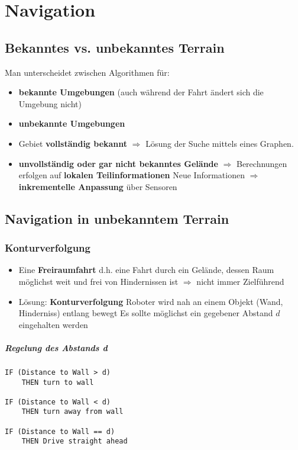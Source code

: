 \chapter{Navigation}
\section{Bekanntes vs. unbekanntes Terrain}
Man unterscheidet zwischen Algorithmen für:
\begin{itemize}
	\item \textbf{bekannte Umgebungen} (auch während der Fahrt ändert sich die Umgebung nicht)
	\item \textbf{unbekannte Umgebungen}
\end{itemize}
\begin{itemize}
	\item Gebiet \textbf{vollständig bekannt} $\Rightarrow$ Lösung der Suche mittels eines Graphen.
	\item \textbf{unvollständig oder gar nicht bekanntes Gelände} $\Rightarrow$ Berechnungen erfolgen auf \textbf{lokalen Teilinformationen}
	\subitem Neue Informationen $\Rightarrow$ \textbf{inkrementelle Anpassung} über Sensoren
\end{itemize}
\section{Navigation in unbekanntem Terrain}
\subsection{Konturverfolgung}
\begin{itemize}
	\item Eine \textbf{Freiraumfahrt} d.h. eine Fahrt durch ein Gelände, dessen Raum möglichst weit und frei von Hindernissen ist $\Rightarrow$ nicht immer Zielführend
	\item Lösung: \textbf{Konturverfolgung}
	\subitem Roboter wird nah an einem Objekt (Wand, Hinderniss) entlang bewegt
	\subitem Es sollte möglichst ein gegebener Abstand $d$ eingehalten werden
\end{itemize}
\paragraph{Regelung des Abstands d}
\begin{lstlisting}
IF (Distance to Wall > d)
	THEN turn to wall

IF (Distance to Wall < d)
	THEN turn away from wall

IF (Distance to Wall == d)
	THEN Drive straight ahead
\end{lstlisting}
\newpage
